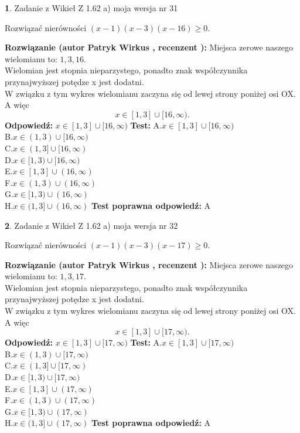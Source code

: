 \documentclass[12pt, a4paper]{article}
\theoremstyle{definition} %
\newtheorem{zad}{}
\newcommand{\zadStart}[1]{\begin{zad}#1\newline}
\newcommand{\zadStop}{\end{zad}}
\newcommand{\rozwStart}[2]{\noindent \textbf{Rozwiązanie (autor #1 , recenzent #2): }\newline}
\newcommand{\rozwStop}{\newline}
\newcommand{\odpStart}{\noindent \textbf{Odpowiedź:}\newline}
\newcommand{\odpStop}{\newline}
\newcommand{\testStart}{\noindent \textbf{Test:}\newline}
\newcommand{\testStop}{\newline}
\newcommand{\kluczStart}{\noindent \textbf{Test poprawna odpowiedź:}\newline}
\newcommand{\kluczStop}{\newline}
\begin{document}
\zadStart{Zadanie z Wikieł Z 1.62 a) moja wersja nr 31}

Rozwiązać nierówności $(x-1)(x-3)(x-16)\ge0$.
\zadStop
\rozwStart{Patryk Wirkus}{}
Miejsca zerowe naszego wielomianu to: $1, 3, 16$.\\
Wielomian jest stopnia nieparzystego, ponadto znak współczynnika przy\linebreak najwyższej potędze x jest dodatni.\\ W związku z tym wykres wielomianu zaczyna się od lewej strony poniżej osi OX. A więc $$x \in [1,3] \cup [16,\infty).$$
\rozwStop
\odpStart
$x \in [1,3] \cup [16,\infty)$
\odpStop
\testStart
A.$x \in [1,3] \cup [16,\infty)$\\
B.$x \in (1,3) \cup [16,\infty)$\\
C.$x \in (1,3] \cup [16,\infty)$\\
D.$x \in [1,3) \cup [16,\infty)$\\
E.$x \in [1,3] \cup (16,\infty)$\\
F.$x \in (1,3) \cup (16,\infty)$\\
G.$x \in [1,3) \cup (16,\infty)$\\
H.$x \in (1,3] \cup (16,\infty)$
\testStop
\kluczStart
A
\kluczStop



\zadStart{Zadanie z Wikieł Z 1.62 a) moja wersja nr 32}

Rozwiązać nierówności $(x-1)(x-3)(x-17)\ge0$.
\zadStop
\rozwStart{Patryk Wirkus}{}
Miejsca zerowe naszego wielomianu to: $1, 3, 17$.\\
Wielomian jest stopnia nieparzystego, ponadto znak współczynnika przy\linebreak najwyższej potędze x jest dodatni.\\ W związku z tym wykres wielomianu zaczyna się od lewej strony poniżej osi OX. A więc $$x \in [1,3] \cup [17,\infty).$$
\rozwStop
\odpStart
$x \in [1,3] \cup [17,\infty)$
\odpStop
\testStart
A.$x \in [1,3] \cup [17,\infty)$\\
B.$x \in (1,3) \cup [17,\infty)$\\
C.$x \in (1,3] \cup [17,\infty)$\\
D.$x \in [1,3) \cup [17,\infty)$\\
E.$x \in [1,3] \cup (17,\infty)$\\
F.$x \in (1,3) \cup (17,\infty)$\\
G.$x \in [1,3) \cup (17,\infty)$\\
H.$x \in (1,3] \cup (17,\infty)$
\testStop
\kluczStart
A
\kluczStop
\end{document}

